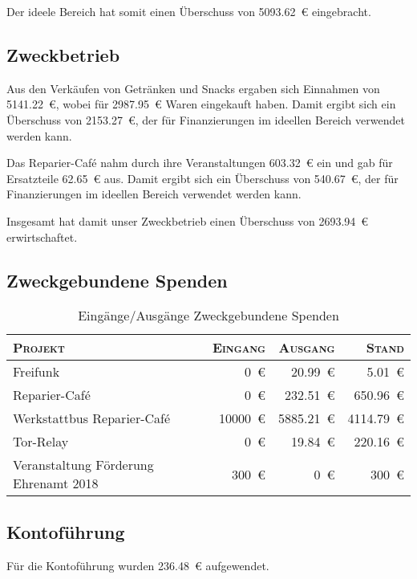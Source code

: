 \documentclass[ngerman]{scrartcl}
\begin{document}
Der ideele Bereich hat somit einen Überschuss von \num{5093,62}~\euro{} eingebracht.
\newpage
\subsection{Zweckbetrieb}
\label{sec:Zweckbetrieb}
Aus den Verkäufen von Getränken und Snacks ergaben sich Einnahmen von \num{5141,22}~\euro{}, wobei für \num{2987,95}~\euro{} Waren eingekauft haben.
Damit ergibt sich ein Überschuss von \num{2153,27}~\euro{}, der für Finanzierungen im ideellen Bereich verwendet werden kann.

Das Reparier-Café nahm durch ihre Veranstaltungen \num{603,32}~\euro{} ein und gab für Ersatzteile \num{62,65}~\euro{} aus.
Damit ergibt sich ein Überschuss von \num{540,67}~\euro{}, der für Finanzierungen im ideellen Bereich verwendet werden kann.

Insgesamt hat damit unser Zweckbetrieb einen Überschuss von \num{2693,94}~\euro{} erwirtschaftet.

\subsection{Zweckgebundene Spenden}
\label{sec:zweckgebundene_spenden}


\begin{table}[h]
        \centering
        \begin{tabular}{l|r|r|r}
        \toprule
        \textsc{Projekt} & \textsc{Eingang} & \textsc{Ausgang} & \textsc{Stand} \\
        \midrule
        Freifunk & \num{0}~\euro{} & \num{20,99}~\euro{} & \num{5,01}~\euro{} \\
        Reparier-Café & \num{0}~\euro{} & \num{232,51}~\euro{} & \num{650,96}~\euro{} \\
        Werkstattbus Reparier-Café & \num{10000}~\euro{} & \num{5885,21}~\euro{} & \num{4114,79}~\euro{} \\
        Tor-Relay & \num{0}~\euro{} & \num{19,84}~\euro{} & \num{220,16}~\euro{} \\
        Veranstaltung Förderung Ehrenamt 2018 & \num{300}~\euro{} & \num{0}~\euro{} & \num{300}~\euro{} \\
\bottomrule
        \end{tabular}
        \caption{Eingänge/Ausgänge Zweckgebundene Spenden}
        \label{table:spenden}
\end{table}

\subsection{Kontoführung}
\label{sec:Kontoführung}
Für die Kontoführung wurden \num{236,48}~\euro{} aufgewendet.
\end{document}
